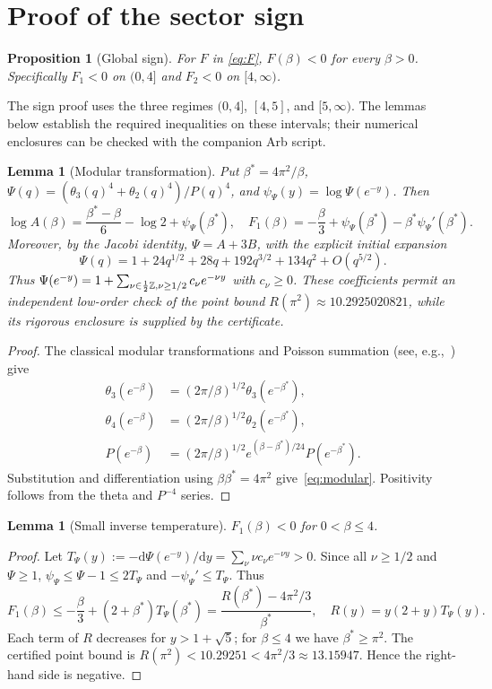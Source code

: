 \documentclass[10pt,a4paper]{article}
\numberwithin{equation}{section}
\newtheorem{lemma}[theorem]{Lemma}\newtheorem{proposition}[theorem]{Proposition}
\theoremstyle{remark}\newtheorem{remark}[theorem]{Remark}\newtheorem{question}[theorem]{Question}
\newcommand{\dd}{\mathrm d}
\begin{document}
\section{Proof of the sector sign}\label{app:sign}
\begin{proposition}[Global sign]\label{prop:sign}
For $F$ in \eqref{eq:F}, $F(\beta)<0$ for every $\beta>0$. Specifically $F_1<0$ on $(0,4]$ and $F_2<0$ on $[4,\infty)$.
\end{proposition}
The sign proof uses the three regimes $(0,4]$, $[4,5]$, and $[5,\infty)$. The lemmas below establish the required inequalities on these intervals; their numerical enclosures can be checked with the companion Arb script.
\begin{lemma}[Modular transformation]\label{lem:modular}
Put $\beta^*=4\pi^2/\beta$, $\Psi(q)=(\theta_3(q)^4+\theta_2(q)^4)/P(q)^4$, and $\psi_{\Psi}(y)=\log\Psi(e^{-y})$. Then
\begin{equation}\label{eq:modular}
\log A(\beta)=\frac{\beta^*-\beta}{6}-\log2+\psi_{\Psi}(\beta^*),\quad
F_1(\beta)=-\frac\beta3+\psi_{\Psi}(\beta^*)-\beta^*\psi_{\Psi}'(\beta^*).
\end{equation}
Moreover, by the Jacobi identity, $\Psi=A+3B$, with the explicit initial expansion
\[
\Psi(q)=1+24q^{1/2}+28q+192q^{3/2}+134q^2+O(q^{5/2}).
\]
Thus $\Psi(e^{-y})=1+\sum_{\nu\in\frac12\mathbb Z,\nu\ge1/2}c_\nu e^{-\nu y}$ with $c_\nu\ge0$. These coefficients permit an independent low-order check of the point bound $R(\pi^2)\approx10.2925020821$, while its rigorous enclosure is supplied by the certificate.
\end{lemma}
\begin{proof}
The classical modular transformations and Poisson summation
(see, e.g.,~\cite{apostol}) give
\begin{align*}
\theta_3(e^{-\beta})
 &= (2\pi/\beta)^{1/2}\theta_3(e^{-\beta^*}),\\
\theta_4(e^{-\beta})
 &= (2\pi/\beta)^{1/2}\theta_2(e^{-\beta^*}),\\
P(e^{-\beta})
 &= (2\pi/\beta)^{1/2}e^{(\beta-\beta^*)/24}P(e^{-\beta^*}).
\end{align*}
Substitution and differentiation using $\beta\beta^*=4\pi^2$
give~\eqref{eq:modular}. Positivity follows from the theta and
$P^{-4}$ series.
\end{proof}
\begin{lemma}[Small inverse temperature]\label{lem:small}
$F_1(\beta)<0$ for $0<\beta\le4$.
\end{lemma}
\begin{proof}Let $T_{\Psi}(y):=-\dd\Psi(e^{-y})/\dd y=\sum_\nu \nu c_\nu e^{-\nu y}>0$. Since all $\nu\ge1/2$ and $\Psi\ge1$, $\psi_{\Psi}\le\Psi-1\le2T_{\Psi}$ and $-\psi_{\Psi}'\le T_{\Psi}$. Thus
\[
F_1(\beta)\le-\frac\beta3+(2+\beta^*)T_{\Psi}(\beta^*)
=\frac{R(\beta^*)-4\pi^2/3}{\beta^*},\quad R(y)=y(2+y)T_{\Psi}(y).
\]
Each term of $R$ decreases for $y>1+\sqrt5$; for $\beta\le4$ we have $\beta^*\ge\pi^2$. The certified point bound is $R(\pi^2)<10.29251<4\pi^2/3\approx13.15947$. Hence the right-hand side is negative.\end{proof}
\end{document}
